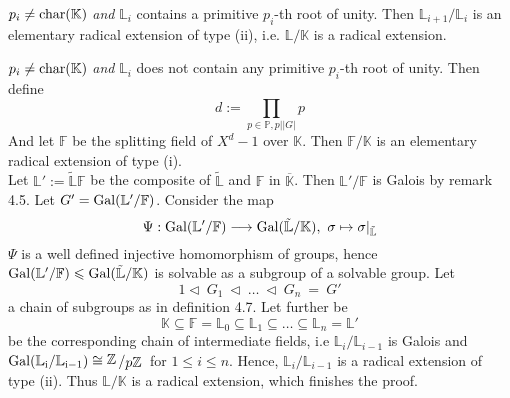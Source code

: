 \documentclass[12pt]{book}
\newcommand{\slant}[2]{{\raisebox{.1em}{$#1$}\left/\raisebox{-.1em}{$#2$}\right.}}
\begin{document}
\begin{spacing}{1.3}
\begin{compactitem}
\begin{compactitem}
\item[\textbf{case 2}] $p_i \neq \rm{char}(\mathbb{K})$ \textit{and} $\mathbb{L}_{i}$ contains a primitive $p_i$-th root of unity. Then $\mathbb{L}_{i+1}/\mathbb{L}_i$ is an elementary radical extension of type (ii), i.e. $\mathbb{L}/\mathbb{K}$ is a radical extension.
\item[\textbf{case 3}] $p_i \neq \rm{char}(\mathbb{K})$ \textit{and} $\mathbb{L}_{i}$ does not contain any primitive $p_i$-th root of unity. Then define
$$d:=\prod_{p \in \mathbb{P}, p \mid \vert G \vert} p$$
And let $\mathbb{F}$ be the splitting field of $X^d-1$ over $\mathbb{K}$.  Then $\mathbb{F}/\mathbb{K}$ is an elementary radical extension of type (i).\\
Let $\mathbb{L}':=\tilde{\mathbb{L}}\mathbb{F}$ be the composite of $\tilde{\mathbb{L}}$ and $\mathbb{F}$ in $\overline{\mathbb{K}}$. Then $\mathbb{L}'/\mathbb{F}$ is Galois by remark 4.5. Let $G'=\rm{Gal}(\mathbb{L}'/\mathbb{F})$. Consider the map
$$\Psi: \rm{Gal}(\mathbb{L}'/\mathbb{F}) \longrightarrow \rm{Gal}(\tilde{\mathbb{L}}/\mathbb{K}), \textrm{ } \sigma \mapsto \sigma |_{\tilde{\mathbb{L}}}$$
$\Psi$ is a well defined injective homomorphism of groups, hence $\rm{Gal}(\mathbb{L}'/\mathbb{F}) \leqslant \rm{Gal}(\tilde{\mathbb{L}}/\mathbb{K})$ is solvable as a subgroup of a solvable group. Let 
$$1 \triangleleft \ G_1\ \triangleleft\ \dots \ \triangleleft\ G_n \ =\ G'$$
a chain of subgroups as in definition 4.7. Let further be 
$$\mathbb{K} \subseteq \mathbb{F}=\mathbb{L}_0 \subseteq \mathbb{L}_1 \subseteq \dots \subseteq \mathbb{L}_n=\mathbb{L}'$$
be the corresponding chain of intermediate fields, i.e $\mathbb{L}_{i}/\mathbb{L}_{i-1}$ is Galois and $\rm{Gal}(\mathbb{L}_{i}/\mathbb{L}_{i-1}) \cong \slant{\mathbb{Z}}{p \mathbb{Z}}$ for $1 \leqslant i \leqslant n$.
Hence, $\mathbb{L}_{i}/\mathbb{L}_{i-1}$ is a radical extension of type (ii).
Thus $\mathbb{L}/\mathbb{K}$ is a radical extension, which finishes the proof.
\end{compactitem}
\end{compactitem}


\end{spacing}
\end{document}
